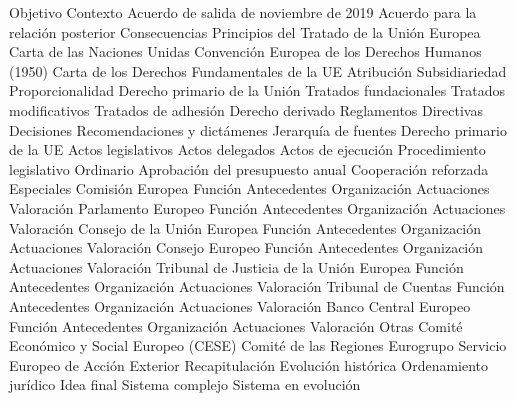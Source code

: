 \documentclass{nuevotema}
\begin{document}
\begin{esquema}[enumerate]
			\3 Objetivo
			\3 Contexto
			\3 Acuerdo de salida de noviembre de 2019
			\3 Acuerdo para la relación posterior
			\3 Consecuencias
	\1 
		\2 Principios del Tratado de la Unión Europea
			\3 Carta de las Naciones Unidas
			\3 Convención Europea de los Derechos Humanos (1950)
			\3 Carta de los Derechos Fundamentales de la UE
			\3 Atribución
			\3 Subsidiariedad
			\3 Proporcionalidad
		\2 Derecho primario de la Unión
			\3 Tratados fundacionales
			\3 Tratados modificativos
			\3 Tratados de adhesión
		\2 Derecho derivado
			\3 Reglamentos
			\3 Directivas
			\3 Decisiones
			\3 Recomendaciones y dictámenes
		\2 Jerarquía de fuentes
			\3[1] Derecho primario de la UE
			\3[2] Actos legislativos
			\3[3] Actos delegados
			\3[4] Actos de ejecución
		\2 Procedimiento legislativo
			\3 Ordinario
			\3 Aprobación del presupuesto anual
			\3 Cooperación reforzada
			\3 Especiales
	\1 
		\2 Comisión Europea
			\3 Función
			\3 Antecedentes
			\3 Organización
			\3 Actuaciones
			\3 Valoración
		\2 Parlamento Europeo
			\3 Función
			\3 Antecedentes
			\3 Organización
			\3 Actuaciones
			\3 Valoración
		\2 Consejo de la Unión Europea
			\3 Función
			\3 Antecedentes
			\3 Organización
			\3 Actuaciones
			\3 Valoración
		\2 Consejo Europeo
			\3 Función
			\3 Antecedentes
			\3 Organización
			\3 Actuaciones
			\3 Valoración
		\2 Tribunal de Justicia de la Unión Europea
			\3 Función
			\3 Antecedentes
			\3 Organización
			\3 Actuaciones
			\3 Valoración
		\2 Tribunal de Cuentas
			\3 Función
			\3 Antecedentes
			\3 Organización
			\3 Actuaciones
			\3 Valoración
		\2 Banco Central Europeo
			\3 Función
			\3 Antecedentes
			\3 Organización
			\3 Actuaciones
			\3 Valoración
		\2 Otras
			\3 Comité Económico y Social Europeo (CESE)
			\3 Comité de las Regiones
			\3 Eurogrupo
			\3 Servicio Europeo de Acción Exterior
	\1[] 
		\2 Recapitulación
			\3 Evolución histórica
			\3 Ordenamiento jurídico
		\2 Idea final
			\3 Sistema complejo
			\3 Sistema en evolución

\end{esquema}

\esquemalargo
\end{document}
